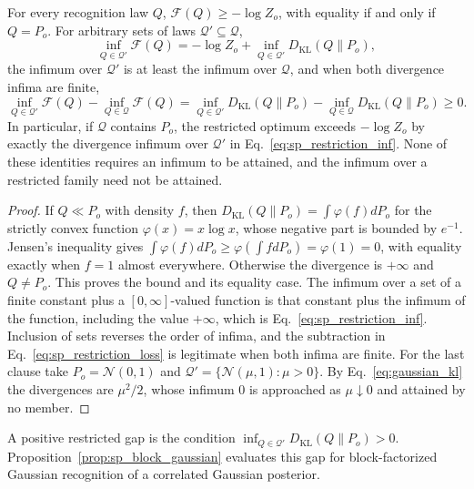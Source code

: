 \begin{proposition}\label{prop:sp_restriction}
For every recognition law $Q$, $\mathcal F(Q)\geq-\log Z_o$, with equality if and only if $Q=P_o$. For arbitrary sets of laws $\mathcal Q'\subseteq\mathcal Q$,
\begin{equation}
\inf_{Q\in\mathcal Q'}\mathcal F(Q)=-\log Z_o+\inf_{Q\in\mathcal Q'}D_{\mathrm{KL}}(Q\|P_o),
\label{eq:sp_restriction_inf}
\end{equation}
the infimum over $\mathcal Q'$ is at least the infimum over $\mathcal Q$, and when both divergence infima are finite,
\begin{equation}
\inf_{Q\in\mathcal Q'}\mathcal F(Q)-\inf_{Q\in\mathcal Q}\mathcal F(Q)
=\inf_{Q\in\mathcal Q'}D_{\mathrm{KL}}(Q\|P_o)-\inf_{Q\in\mathcal Q}D_{\mathrm{KL}}(Q\|P_o)\geq0.
\label{eq:sp_restriction_loss}
\end{equation}
In particular, if $\mathcal Q$ contains $P_o$, the restricted optimum exceeds $-\log Z_o$ by exactly the divergence infimum over $\mathcal Q'$ in Eq.~\eqref{eq:sp_restriction_inf}. None of these identities requires an infimum to be attained, and the infimum over a restricted family need not be attained.
\end{proposition}
\begin{proof}
If $Q\ll P_o$ with density $f$, then $D_{\mathrm{KL}}(Q\|P_o)=\int\varphi(f)dP_o$ for the strictly convex function $\varphi(x)=x\log x$, whose negative part is bounded by $e^{-1}$. Jensen's inequality gives $\int\varphi(f)dP_o\geq\varphi(\int fdP_o)=\varphi(1)=0$, with equality exactly when $f=1$ almost everywhere. Otherwise the divergence is $+\infty$ and $Q\neq P_o$. This proves the bound and its equality case. The infimum over a set of a finite constant plus a $[0,\infty]$-valued function is that constant plus the infimum of the function, including the value $+\infty$, which is Eq.~\eqref{eq:sp_restriction_inf}. Inclusion of sets reverses the order of infima, and the subtraction in Eq.~\eqref{eq:sp_restriction_loss} is legitimate when both infima are finite. For the last clause take $P_o=\mathcal N(0,1)$ and $\mathcal Q'=\{\mathcal N(\mu,1):\mu>0\}$. By Eq.~\eqref{eq:gaussian_kl} the divergences are $\mu^2/2$, whose infimum $0$ is approached as $\mu\downarrow0$ and attained by no member.
\end{proof}
A positive restricted gap is the condition $\inf_{Q\in\mathcal Q'}D_{\mathrm{KL}}(Q\|P_o)>0$. Proposition~\ref{prop:sp_block_gaussian} evaluates this gap for block-factorized Gaussian recognition of a correlated Gaussian posterior.

